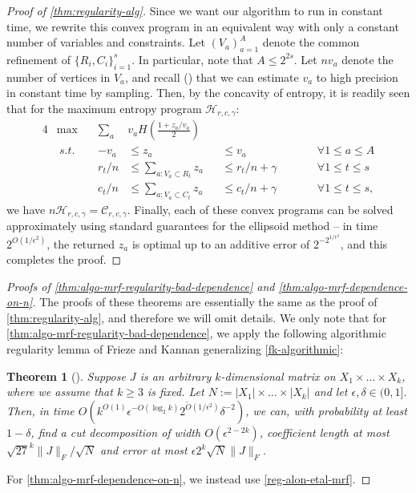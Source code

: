 \documentclass[final, 12pt]{colt2018}
\newtheorem{theorem}{Theorem}[section]
\theoremstyle{definition}
\theoremstyle{plain}
\begin{document}
\begin{proof}[Proof of \cref{thm:regularity-alg}]
Since we want our algorithm to run in constant time, we rewrite this convex program in an equivalent way with only a constant number of variables and constraints. Let $(V_a)_{a=1}^{A}$ denote the common refinement of $\{R_i, C_i\}_{i=1}^{s}$. In particular, note that $A \leq 2^{2s}$. 
Let $n v_a$ denote
the number of vertices in $V_a$, and recall () that we can estimate $v_a$ to
high precision in constant time by sampling. Then, by the concavity of entropy, it is readily seen that for the maximum entropy program $\mathcal{H}_{r,c,\gamma}$:
\begin{alignat*}{4}
&\max\quad &\sum_a &v_a H\left(\frac{1 + z_a/v_a}{2}\right)\\
&\ s.t.\quad&-v_a &\le z_a &&\le v_a &\qquad& \forall 1 \le a \le A\\
&&{r_t/n} &\le \sum_{a : V_a \subset R_t} z_a &&\le {r_t/n} + \gamma && \forall 1 \le t \le s \\
&&{c_t/n} &\le \sum_{a : V_a \subset C_t} z_a &&\le {c_t/n} + \gamma && \forall 1 \le t \le s,
\end{alignat*}
we have $n\mathcal{H}_{r,c,\gamma} = \mathcal{C}_{r,c,\gamma}$. Finally, each of these convex programs can be solved approximately using standard guarantees for the ellipsoid method \citep{gls} -- in time $2^{O(1/\epsilon^2)}$,
the returned $z_a$ is optimal up to an additive error of $2^{-2^{1/\epsilon^2}}$, and this completes the proof. 
\end{proof}

\begin{proof}[Proofs of \cref{thm:algo-mrf-regularity-bad-dependence} and \cref{thm:algo-mrf-dependence-on-n}] The proofs of these theorems are essentially the same as the proof of \cref{thm:regularity-alg}, and therefore we will omit details. We only note that for \cref{thm:algo-mrf-regularity-bad-dependence}, we apply the following algorithmic regularity lemma of Frieze and Kannan generalizing \cref{fk-algorithmic}:

\begin{theorem}[\citet{frieze-kannan-matrix}]\label{reg-fk-higher}
Suppose $J$ is an arbitrary $k$-dimensional matrix on $X_{1}\times\dots\times X_{k}$,
where we assume that $k\geq3$ is fixed. Let $N:=|X_{1}|\times\dots\times|X_{k}|$
and let $\epsilon,\delta\in(0,1]$. Then, in time $O(k^{O(1)}\epsilon^{-O(\log_{2}k)}2^{\tilde{O}(1/\epsilon^{2})}\delta^{-2})$,
we can, with probability at least $1-\delta$, find a cut decomposition
of width $O(\epsilon^{2-2k})$, coefficient length at most $\sqrt{27}^{k}\|J\|_F/\sqrt{N}$
and error at most $\epsilon2^{k}\sqrt{N}\|J\|_F$.
\end{theorem}

For \cref{thm:algo-mrf-dependence-on-n}, we instead use \cref{reg-alon-etal-mrf}. 
\end{proof}
\end{document}
